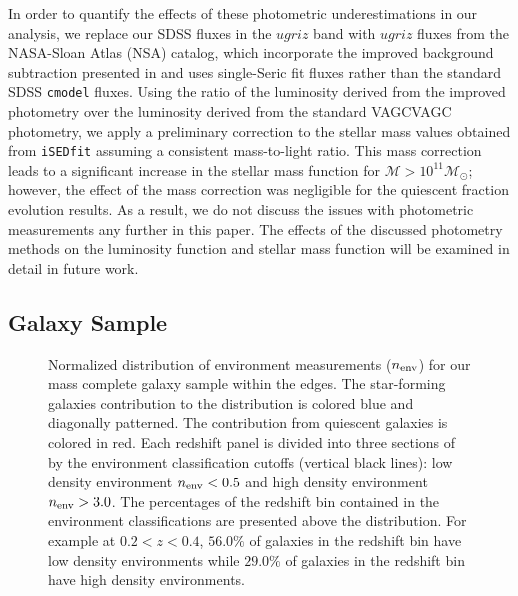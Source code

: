 \documentclass{emulateapj}
\begin{document}
In order to quantify the effects of these photometric underestimations in our analysis, we replace our SDSS fluxes in the $ugriz$ band with $ugriz$ fluxes from the NASA-Sloan Atlas (NSA) catalog, which incorporate the improved background subtraction presented in \cite{Blanton:2011aa} and uses single-Seric fit fluxes rather than the standard SDSS \texttt{cmodel} fluxes. Using the ratio of the luminosity derived from the improved photometry over the luminosity derived from the standard VAGCVAGC photometry, we apply a preliminary correction to the stellar mass values obtained from \texttt{iSEDfit} assuming a consistent mass-to-light ratio. This mass correction leads to a significant increase in the stellar mass function for $\mathcal{M} > 10^{11} \mathcal{M}_{\odot}$; however, the effect of the mass correction was negligible for the quiescent fraction evolution results. As a result, we do not discuss the issues with photometric measurements any further in this paper. The effects of the discussed photometry methods on the luminosity function and stellar mass function will be examined in detail in future work. 
\subsection{Galaxy Sample} \label{sec:target} 
\begin{figure*}
  \begin{center}
    \leavevmode
     \caption{Normalized distribution of environment measurements ($n_{\rm{env}}$) for our mass complete galaxy sample within the edges. The star-forming galaxies contribution to the distribution is colored blue and diagonally patterned. The contribution from quiescent galaxies is colored in red. Each redshift panel is divided into three sections of by the environment classification cutoffs (vertical black lines): low density environment $n_{\rm{env}} < 0.5$ and high density environment $n_{\rm{env}} > 3.0$. The percentages of the redshift bin contained in the environment classifications are presented above the distribution. For example at $0.2 < z < 0.4$, $56.0 \%$ of galaxies in the redshift bin have low density environments while $29.0\%$ of galaxies in the redshift bin have high density environments. }      \label{fig:envcount}
    \end{center}
\end{figure*}
\end{document}
